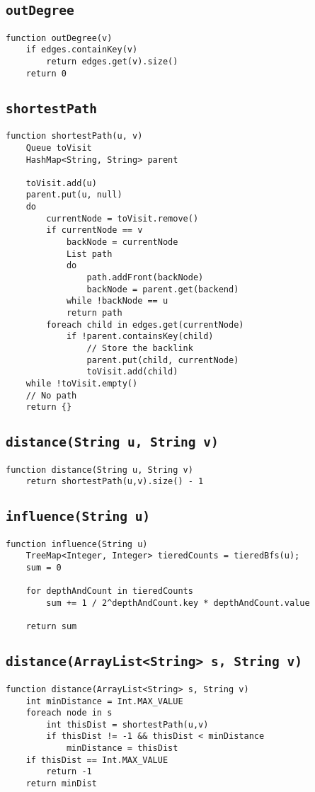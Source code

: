\documentclass[10pt,letterpaper]{article}
\begin{document}
\subsection{\texttt{outDegree}}
\begin{verbatim}
function outDegree(v)
    if edges.containKey(v)
        return edges.get(v).size()
	return 0
\end{verbatim}
\subsection{\texttt{shortestPath}}
\begin{verbatim}
function shortestPath(u, v)
   	Queue toVisit
   	HashMap<String, String> parent

   	toVisit.add(u)
   	parent.put(u, null)
   	do
   	    currentNode = toVisit.remove()
   	    if currentNode == v
   	        backNode = currentNode
   	        List path
   	        do
   	            path.addFront(backNode)
   	            backNode = parent.get(backend)
   	        while !backNode == u
   	        return path
   	    foreach child in edges.get(currentNode)
   	        if !parent.containsKey(child)
   	            // Store the backlink
   	            parent.put(child, currentNode)
   	            toVisit.add(child)
   	while !toVisit.empty()
   	// No path
   	return {}
\end{verbatim}
\subsection{\texttt{distance(String u, String v)}}
\begin{verbatim}
function distance(String u, String v) 
   	return shortestPath(u,v).size() - 1
\end{verbatim}
\subsection{\texttt{influence(String u) }}
\begin{verbatim}
function influence(String u)
    TreeMap<Integer, Integer> tieredCounts = tieredBfs(u);
    sum = 0

    for depthAndCount in tieredCounts
        sum += 1 / 2^depthAndCount.key * depthAndCount.value

    return sum
\end{verbatim}
\subsection{\texttt{distance(ArrayList<String> s, String v)}}
\begin{verbatim}
function distance(ArrayList<String> s, String v) 
    int minDistance = Int.MAX_VALUE
    foreach node in s
        int thisDist = shortestPath(u,v)
        if thisDist != -1 && thisDist < minDistance
            minDistance = thisDist
    if thisDist == Int.MAX_VALUE
        return -1
    return minDist
\end{verbatim}
\end{document}
